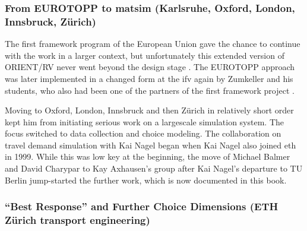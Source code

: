 \subsubsection{From EUROTOPP to \gls{matsim} (Karlsruhe, Oxford, London, Innsbruck, Zürich)}


The  first framework program of the European Union gave the chance to continue with the work in a larger context, but unfortunately this extended version of ORIENT/RV never went beyond the design stage \citep[][]{AxhausenGoodwin1991}. The EUROTOPP approach was later implemented in a changed form at the \gls{ifv} again by Zumkeller and his students, who also had been one of the partners of the first framework project \citep[][]{SchnittgerZumkeller_ETC_2004}.

Moving to Oxford, London, Innsbruck and then Zürich in relatively short order kept him from initiating serious work on a \gls{largescale} simulation system. 
The focus switched to data collection and choice modeling. 
The collaboration on travel demand simulation with Kai Nagel began when Kai Nagel also joined \gls{eth} in 1999. 
While this was low key at the beginning, the move of Michael Balmer and David Charypar to Kay Axhausen's group after Kai Nagel's departure to TU Berlin jump-started the further work, which is now documented in %
this book.


\subsubsection{``Best Response'' and Further Choice Dimensions (ETH Zürich transport engineering)}
\label{sec:zhgroup_matsim}


